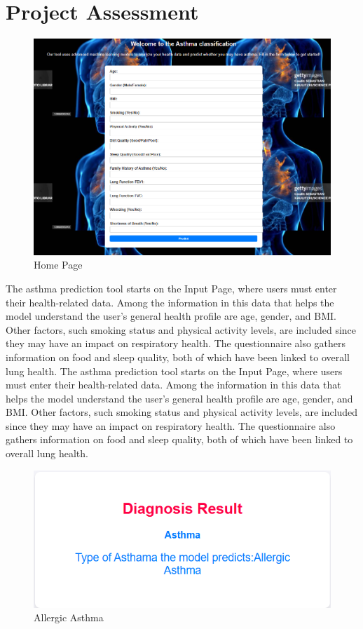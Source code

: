 \section{Project Assessment}
\begin{figure}[h]
    \centering
    \includegraphics[width=0.9\linewidth]{Images/u1.png}
    \caption{Home Page}
    \label{fig:ui1}
\end{figure}
The asthma prediction tool starts on the Input Page, where users must enter their health-related data. Among the information in this data that helps the model understand the user's general health profile are age, gender, and BMI. Other factors, such smoking status and physical activity levels, are included since they may have an impact on respiratory health. The questionnaire also gathers information on food and sleep quality, both of which have been linked to overall lung health. The asthma prediction tool starts on the Input Page, where users must enter their health-related data. Among the information in this data that helps the model understand the user's general health profile are age, gender, and BMI. Other factors, such smoking status and physical activity levels, are included since they may have an impact on respiratory health. The questionnaire also gathers information on food and sleep quality, both of which have been linked to overall lung health. 
\begin{figure}[h]
    \centering
    \begin{minipage}{0.5\linewidth}
        \centering
        \includegraphics[width=\linewidth]{Images/u2.png}
        \caption{Allergic Asthma}
        \label{fig:ui5}
    \end{minipage}
\end{figure}
